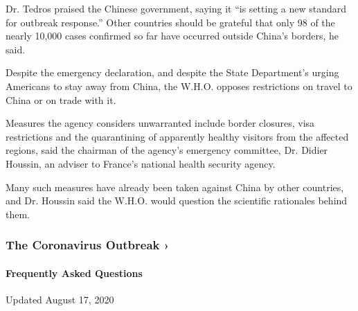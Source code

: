 Dr. Tedros praised the Chinese government, saying it ``is setting a new
standard for outbreak response.'' Other countries should be grateful
that only 98 of the nearly 10,000 cases confirmed so far have occurred
outside China's borders, he said.

Despite the emergency declaration, and despite the State Department's
urging Americans to stay away from China, the W.H.O. opposes
restrictions on travel to China or on trade with it.

Measures the agency considers unwarranted include border closures, visa
restrictions and the quarantining of apparently healthy visitors from
the affected regions, said the chairman of the agency's emergency
committee, Dr. Didier Houssin, an adviser to France's national health
security agency.

Many such measures have already been taken against China by other
countries, and Dr. Houssin said the W.H.O. would question the scientific
rationales behind them.

\href{https://www.nytimes3xbfgragh.onion/news-event/coronavirus?action=click\&pgtype=Article\&state=default\&region=MAIN_CONTENT_3\&context=storylines_faq}{}

\hypertarget{the-coronavirus-outbreak-}{%
\subsubsection{The Coronavirus Outbreak
›}\label{the-coronavirus-outbreak-}}

\hypertarget{frequently-asked-questions}{%
\paragraph{Frequently Asked
Questions}\label{frequently-asked-questions}}

Updated August 17, 2020

